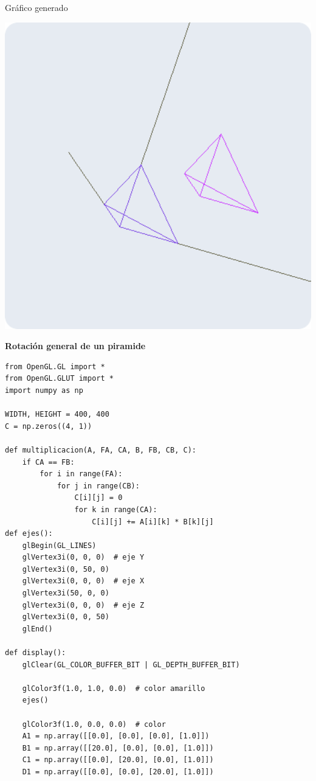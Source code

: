 \documentclass[a4paper]{article}
\begin{document}
\newpage
Gráfico generado 
\begin{center}
\includegraphics[width=16cm]{./src/1.png}
\end{center}
\newpage
\Large{\textbf{Rotación general de un piramide}}\\[-0.4cm]
\begin{center}
\begin{mycodeboxl}
\begin{lstlisting}
from OpenGL.GL import *
from OpenGL.GLUT import *
import numpy as np

WIDTH, HEIGHT = 400, 400
C = np.zeros((4, 1))

def multiplicacion(A, FA, CA, B, FB, CB, C):
    if CA == FB:
        for i in range(FA):
            for j in range(CB):
                C[i][j] = 0
                for k in range(CA):
                    C[i][j] += A[i][k] * B[k][j]
def ejes():
    glBegin(GL_LINES)
    glVertex3i(0, 0, 0)  # eje Y
    glVertex3i(0, 50, 0)
    glVertex3i(0, 0, 0)  # eje X
    glVertex3i(50, 0, 0)
    glVertex3i(0, 0, 0)  # eje Z
    glVertex3i(0, 0, 50)
    glEnd()

def display():
    glClear(GL_COLOR_BUFFER_BIT | GL_DEPTH_BUFFER_BIT)

    glColor3f(1.0, 1.0, 0.0)  # color amarillo
    ejes()

    glColor3f(1.0, 0.0, 0.0)  # color 
    A1 = np.array([[0.0], [0.0], [0.0], [1.0]])
    B1 = np.array([[20.0], [0.0], [0.0], [1.0]])
    C1 = np.array([[0.0], [20.0], [0.0], [1.0]])
    D1 = np.array([[0.0], [0.0], [20.0], [1.0]])
\end{lstlisting}
\end{mycodeboxl}
\end{center}
\end{document}
